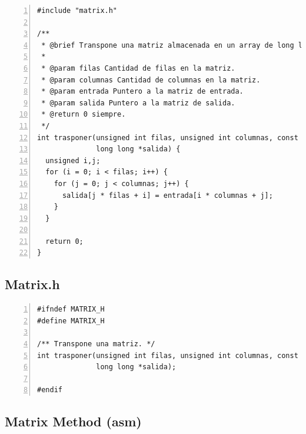 \documentclass[11pt,a4paper]{article}
\begin{document}
\begin{lstlisting}[numbers=left, tabsize=2, basicstyle=\fontsize{11}{13}\ttfamily, frame=single, caption={Matrix method (c)}]
#include "matrix.h"

/**
 * @brief Transpone una matriz almacenada en un array de long long.
 *
 * @param filas Cantidad de filas en la matriz.
 * @param columnas Cantidad de columnas en la matriz.
 * @param entrada Puntero a la matriz de entrada.
 * @param salida Puntero a la matriz de salida.
 * @return 0 siempre.
 */
int trasponer(unsigned int filas, unsigned int columnas, const long long *entrada,
              long long *salida) {
  unsigned i,j;
  for (i = 0; i < filas; i++) {
    for (j = 0; j < columnas; j++) {
      salida[j * filas + i] = entrada[i * columnas + j];
    }
  }

  return 0;
}
\end{lstlisting}


\subsection{Matrix.h}

\begin{lstlisting}[numbers=left, tabsize=2, basicstyle=\fontsize{11}{13}\ttfamily, frame=single, caption={Matrix method (c)}]
#ifndef MATRIX_H
#define MATRIX_H

/** Transpone una matriz. */
int trasponer(unsigned int filas, unsigned int columnas, const long long *entrada,
              long long *salida);

#endif
\end{lstlisting}


\subsection{Matrix Method (asm)}
\end{document}
